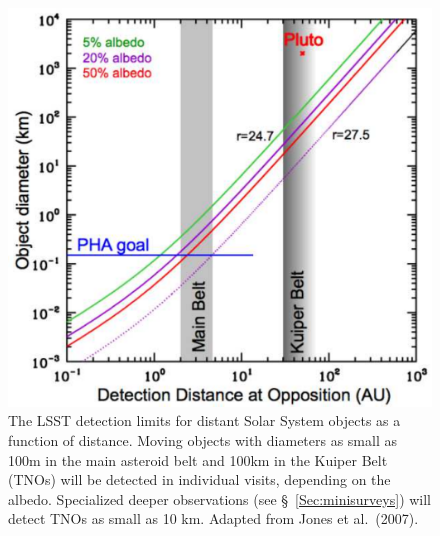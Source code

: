 \begin{figure}
\includegraphics[width=1.0\hsize,clip]{Af9.pdf}
\caption{The LSST detection limits for distant Solar System objects as
  a function of distance.
Moving objects with diameters as small as 100m in the main asteroid belt and
100km in the Kuiper Belt (TNOs) will be detected in individual visits,
depending on the albedo. Specialized deeper observations
(see \S~\ref{Sec:minisurveys}) will detect TNOs as small as 10 km. Adapted from
Jones et al.~(2007).}
\label{Fig:Af9}
\end{figure}



